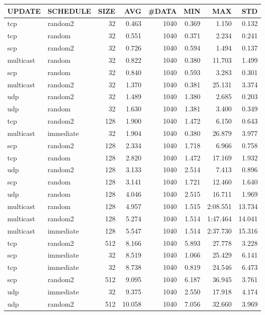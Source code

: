 \begin{tabular}{|l|l|r|r|r|r|r|r|}
\hline
UPDATE & SCHEDULE & SIZE & AVG & \#DATA & MIN & MAX & STD\\
\hline
tcp & random2 & 32 & 0.463 & 1040 & 0.369 & 1.150 & 0.132\\
tcp & random & 32 & 0.551 & 1040 & 0.371 & 2.234 & 0.241\\
scp & random2 & 32 & 0.726 & 1040 & 0.594 & 1.494 & 0.137\\
multicast & random & 32 & 0.822 & 1040 & 0.380 & 11.703 & 1.499\\
scp & random & 32 & 0.840 & 1040 & 0.593 & 3.283 & 0.301\\
multicast & random2 & 32 & 1.370 & 1040 & 0.381 & 25.131 & 3.374\\
udp & random2 & 32 & 1.489 & 1040 & 1.380 & 2.685 & 0.203\\
udp & random & 32 & 1.630 & 1040 & 1.381 & 3.400 & 0.349\\
tcp & random2 & 128 & 1.900 & 1040 & 1.472 & 6.150 & 0.643\\
multicast & immediate & 32 & 1.904 & 1040 & 0.380 & 26.879 & 3.977\\
scp & random2 & 128 & 2.334 & 1040 & 1.718 & 6.966 & 0.758\\
tcp & random & 128 & 2.820 & 1040 & 1.472 & 17.169 & 1.932\\
udp & random2 & 128 & 3.133 & 1040 & 2.514 & 7.413 & 0.896\\
scp & random & 128 & 3.141 & 1040 & 1.721 & 12.460 & 1.640\\
udp & random & 128 & 4.046 & 1040 & 2.515 & 16.711 & 1.969\\
multicast & random & 128 & 4.957 & 1040 & 1.515 & 2:08.551 & 13.734\\
multicast & random2 & 128 & 5.274 & 1040 & 1.514 & 1:47.464 & 14.041\\
multicast & immediate & 128 & 5.547 & 1040 & 1.514 & 2:37.730 & 15.316\\
tcp & random2 & 512 & 8.166 & 1040 & 5.893 & 27.778 & 3.228\\
scp & immediate & 32 & 8.519 & 1040 & 1.066 & 25.429 & 6.141\\
tcp & immediate & 32 & 8.738 & 1040 & 0.819 & 24.546 & 6.473\\
scp & random2 & 512 & 9.095 & 1040 & 6.187 & 36.945 & 3.761\\
udp & immediate & 32 & 9.375 & 1040 & 2.550 & 17.918 & 4.174\\
udp & random2 & 512 & 10.058 & 1040 & 7.056 & 32.660 & 3.969\\

\end{tabular}
